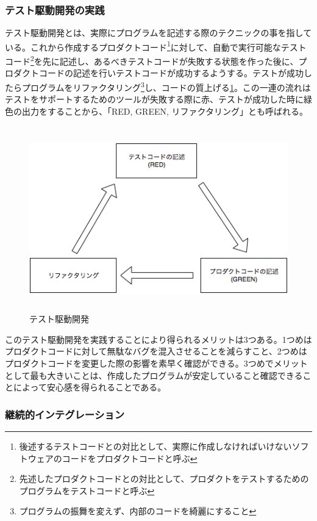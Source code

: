 \subsubsection{テスト駆動開発の実践}

テスト駆動開発とは、実際にプログラムを記述する際のテクニックの事を指している。これから作成するプロダクトコード\footnote{後述するテストコードとの対比として、実際に作成しなければいけないソフトウェアのコードをプロダクトコードと呼ぶ}に対して、自動で実行可能なテストコード\footnote{先述したプロダクトコードとの対比として、プロダクトをテストするためのプログラムをテストコードと呼ぶ}を先に記述し、あるべきテストコードが失敗する状態を作った後に、プロダクトコードの記述を行いテストコードが成功するようする。テストが成功したらプログラムをリファクタリング\footnote{プログラムの振舞を変えず、内部のコードを綺麗にすること}し、コードの質上げる\ref{fig:tdd}。この一連の流れはテストをサポートするためのツールが失敗する際に赤、テストが成功した時に緑色の出力をすることから、「RED, GREEN, リファクタリング」とも呼ばれる。

\begin{figure}[H]
\centering
\includegraphics[height=8cm]{./assets/images/tdd.png}
\caption{テスト駆動開発}
\label{fig:tdd}
\end{figure}


このテスト駆動開発を実践することにより得られるメリットは3つある。1つめはプロダクトコードに対して無駄なバグを混入させることを減らすこと、2つめはプロダクトコードを変更した際の影響を素早く確認ができる。3つめでメリットとして最も大きいことは、作成したプログラムが安定していること確認できることによって安心感を得られることである。

\subsubsection{継続的インテグレーション}

